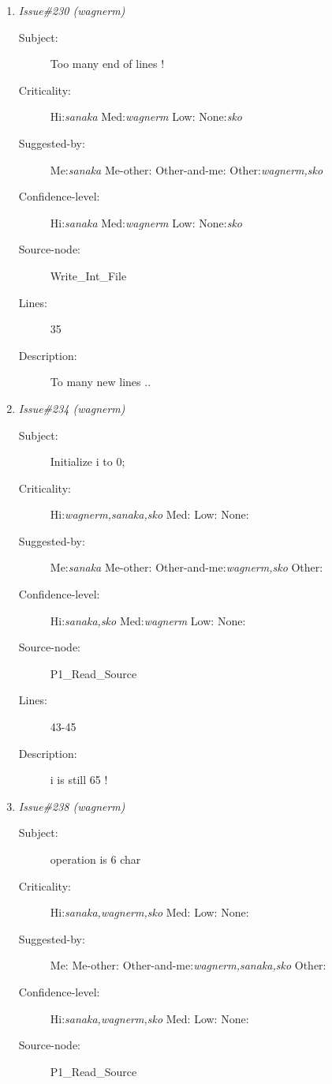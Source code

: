 \begin{enumerate}
\begin{description}
\item [Lines:] 27

\item [Description:] It always falls into the "T"
\end{description}
\item {\it Issue\#230 (wagnerm)}
\begin{description}
\item [Subject:] Too many end of lines !
\item [Criticality:] Hi:{\it sanaka} Med:{\it wagnerm} Low:{\it } None:{\it sko}
\item [Suggested-by:] Me:{\it sanaka} Me-other:{\it } Other-and-me:{\it } Other:{\it wagnerm,sko}
\item [Confidence-level:] Hi:{\it sanaka} Med:{\it wagnerm} Low:{\it } None:{\it sko}
\item [Source-node:] Write\_Int\_File

\item [Lines:] 35

\item [Description:] To many new lines ..
\end{description}
\item {\it Issue\#234 (wagnerm)}
\begin{description}
\item [Subject:] Initialize i to 0;
\item [Criticality:] Hi:{\it wagnerm,sanaka,sko} Med:{\it } Low:{\it } None:{\it }
\item [Suggested-by:] Me:{\it sanaka} Me-other:{\it } Other-and-me:{\it wagnerm,sko} Other:{\it }
\item [Confidence-level:] Hi:{\it sanaka,sko} Med:{\it wagnerm} Low:{\it } None:{\it }
\item [Source-node:] P1\_Read\_Source

\item [Lines:] 43-45

\item [Description:] i is still 65 !
\end{description}
\item {\it Issue\#238 (wagnerm)}
\begin{description}
\item [Subject:] operation is 6 char
\item [Criticality:] Hi:{\it sanaka,wagnerm,sko} Med:{\it } Low:{\it } None:{\it }
\item [Suggested-by:] Me:{\it } Me-other:{\it } Other-and-me:{\it wagnerm,sanaka,sko} Other:{\it }
\item [Confidence-level:] Hi:{\it sanaka,wagnerm,sko} Med:{\it } Low:{\it } None:{\it }
\item [Source-node:] P1\_Read\_Source


\end{description}
\end{enumerate}
